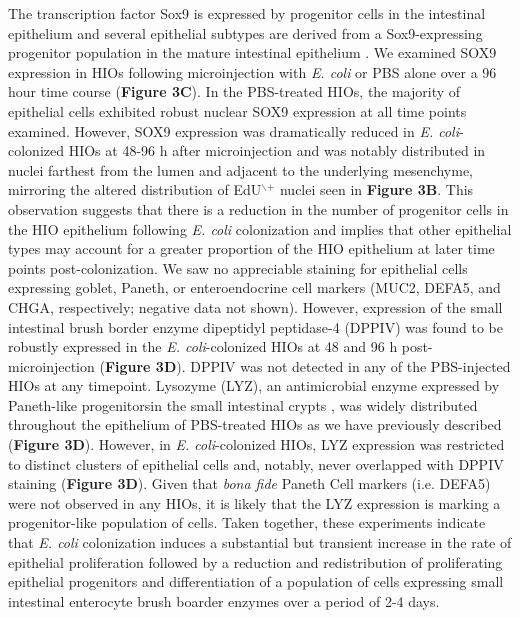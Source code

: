 \documentclass[9pt,lineo]{elife}
\begin{document}
The transcription factor Sox9 is expressed by progenitor cells in the intestinal epithelium \citep{Bastide:2007,Mori-Akiyama:2007} and several epithelial subtypes are derived from a Sox9-expressing progenitor population in the mature intestinal epithelium \citep{Bastide:2007,Furuyama:2011}. We examined SOX9 expression in HIOs following microinjection with \emph{E. coli} or PBS alone over a 96 hour time course (\textbf{Figure 3C}). In the PBS-treated HIOs, the majority of epithelial cells exhibited robust nuclear SOX9 expression at all time points examined. However, SOX9 expression was dramatically reduced in \emph{E. coli}-colonized HIOs at 48-96 h after microinjection and was notably distributed in nuclei farthest from the lumen and adjacent to the underlying mesenchyme, mirroring the altered distribution of EdU\(^{\text{$\backslash$+}}\) nuclei seen in \textbf{Figure 3B}. This observation suggests that there is a reduction in the number of progenitor cells in the HIO epithelium following \emph{E. coli} colonization and implies that other epithelial types may account for a greater proportion of the HIO epithelium at later time points post-colonization. We saw no appreciable staining for epithelial cells expressing goblet, Paneth, or enteroendocrine cell markers (MUC2, DEFA5, and CHGA, respectively; negative data not shown). However, expression of the small intestinal brush border enzyme dipeptidyl peptidase-4 (DPPIV) was found to be robustly expressed in the \emph{E. coli}-colonized HIOs at 48 and 96 h post-microinjection (\textbf{Figure 3D}). DPPIV was not detected in any of the PBS-injected HIOs at any timepoint. Lysozyme (LYZ), an antimicrobial enzyme expressed by Paneth-like progenitorsin the small intestinal crypts \cite{Bevins:2011}, was widely distributed throughout the epithelium of PBS-treated HIOs as we have previously described \citep{Spence:2011}(\textbf{Figure 3D}). However, in \emph{E. coli}-colonized HIOs, LYZ expression was restricted to distinct clusters of epithelial cells and, notably, never overlapped with DPPIV staining (\textbf{Figure 3D}). Given that \emph{bona fide} Paneth Cell markers (i.e. DEFA5) were not observed in any HIOs, it is likely that the LYZ expression is marking a progenitor-like population of cells. Taken together, these experiments indicate that \emph{E. coli} colonization induces a substantial but transient increase in the rate of epithelial proliferation followed by a reduction and redistribution of proliferating epithelial progenitors and differentiation of a population of cells expressing small intestinal enterocyte brush boarder enzymes over a period of 2-4 days.
\end{document}
